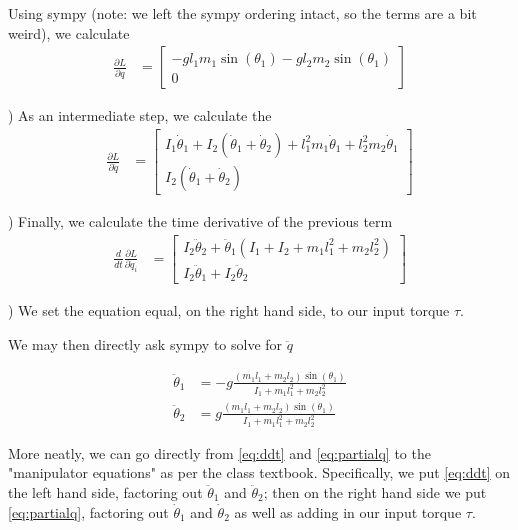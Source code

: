 \documentclass[conference]{IEEEtran}
\begin{document}
Using sympy (note: we left the sympy ordering intact, so the terms are a
bit weird), we calculate
\begin{align}
    \frac{\partial L}{\partial q} &=
    \begin{bmatrix}
        -g l_1 m_1 \sin(\theta_1) - g l_2 m_2 \sin(\theta_1) \\
        0
    \end{bmatrix}
    \label{eq:partialq}
\end{align}

) As an intermediate step, we calculate the
\begin{align}
    \frac{\partial L}{\partial \dot q} &=
    \begin{bmatrix}
        I_1 \dot\theta_1 + I_2 (\dot\theta_1 + \dot\theta_2) +
            l_1^2 m_1 \dot\theta_1 + l_2^2 m_2 \dot \theta_1 \\
            I_2 (\dot \theta_1 + \dot\theta_2)
    \end{bmatrix}
    \label{eq:partialqdot}
\end{align}

) Finally, we calculate the time derivative of the previous term
\begin{align}
    \frac{d}{dt} \frac{\partial L}{\partial \dot q_i} &=
    \begin{bmatrix}
    I_2 \ddot\theta_2 + \ddot\theta_1 ( I_1 +  I_2 +  m_1 l_1^2 + m_2 l_2^2) \\
    I_2 \ddot\theta_1 + I_2 \ddot\theta_2
    \end{bmatrix}
    \label{eq:ddt}
\end{align}

) We set the equation equal, on the right hand side, to our input torque $\tau$.

We may then directly ask sympy to solve for $\ddot q$

\begin{align}
    \ddot \theta_1 &= -g \frac{ (m_1 l_1 + m_2 l_2) \sin(\theta_1)}
        {I_1 + m_1 l_1^2 + m_2 l_2^2} \\
    \ddot \theta_2 &= g \frac{ (m_1 l_1 + m_2 l_2) \sin(\theta_1) }
        {I_1 + m_1 l_1^2 + m_2 l_2^2}
\end{align}

More neatly, we can go directly from \cref{eq:ddt} and
\cref{eq:partialq} to the "manipulator equations" as per the class textbook.
Specifically, we put \cref{eq:ddt} on the left hand side, factoring out
$\ddot \theta_1$ and $\ddot \theta_2$; then on the right hand side we put
\cref{eq:partialq}, factoring out $\dot \theta_1$ and $\dot \theta_2$ as well as
adding in our input torque $\tau$.
\end{document}
